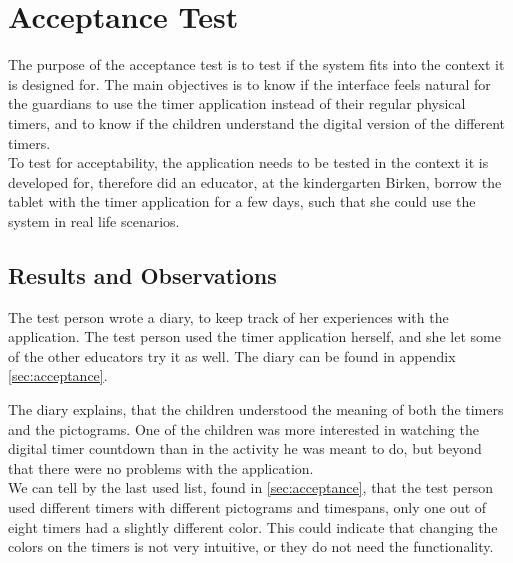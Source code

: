 \section{Acceptance Test}
\label{sec:accept_test}
The purpose of the acceptance test \cite{misc:designInterSys} is to test if the system fits into the context it is designed for. 
The main objectives is to know if the interface feels natural for the guardians to use the timer application instead of their regular physical timers, and to know if the children understand the digital version of the different timers.\\

To test for acceptability, the application needs to be tested in the context it is developed for, therefore did an educator, at the kindergarten Birken, borrow the tablet with the timer application for a few days, such that she could use the system in real life scenarios.

\subsection{Results and Observations}
The test person wrote a diary, to keep track of her experiences with the application. The test person used the timer application herself, and she let some of the other educators try it as well. The diary can be found in appendix \ref{sec:acceptance}.

The diary explains, that the children understood the meaning of both the timers and the pictograms. One of the children was more interested in watching the digital timer countdown than in the activity he was meant to do, but beyond that there were no problems with the application.\\

We can tell by the last used list, found in \autoref{sec:acceptance}, that the test person used different timers with different pictograms and timespans, only one out of eight timers had a slightly different color. This could indicate that changing the colors on the timers is not very intuitive, or they do not need the functionality.